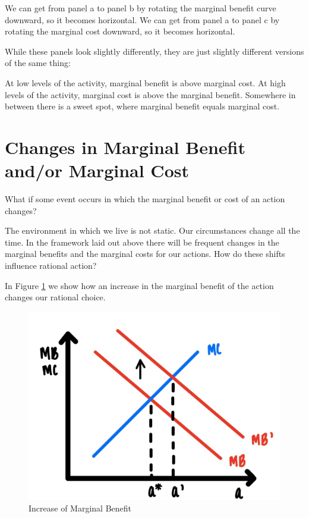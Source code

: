 \documentclass[
]{book}
\begin{document}
We can get from panel a to panel b by rotating the marginal benefit curve downward, so it becomes horizontal. We can get from panel a to panel c by rotating the marginal cost downward, so it becomes horizontal.

While these panels look slightly differently, they are just slightly different versions of the same thing:

At low levels of the activity, marginal benefit is above marginal cost. At high levels of the activity, marginal cost is above the marginal benefit. Somewhere in between there is a sweet spot, where marginal benefit equals marginal cost.

\hypertarget{changes-in-marginal-benefit-andor-marginal-cost}{%
\section{Changes in Marginal Benefit and/or Marginal Cost}\label{changes-in-marginal-benefit-andor-marginal-cost}}

What if some event occurs in which the marginal benefit or cost of an action changes?

The environment in which we live is not static. Our circumstances change all the time. In the framework laid out above there will be frequent changes in the marginal benefits and the marginal costs for our actions. How do these shifts influence rational action?

In Figure \ref{fig:rationalchoice04} we show how an increase in the marginal benefit of the action changes our rational choice.

\begin{figure}

{\centering \includegraphics[width=0.75\linewidth]{img/rationalchoice/fig4} 

}

\caption{Increase of Marginal Benefit}\label{fig:rationalchoice04}
\end{figure}
\end{document}
